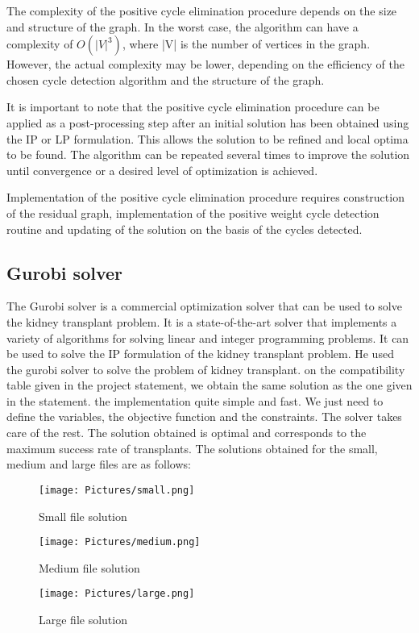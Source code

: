 \documentclass{ULBreport}
\begin{document}
The complexity of the positive cycle elimination procedure depends on the size and structure of the graph. In the worst case, the algorithm can have a complexity of  $O(|V|^3)$, where |V| is the number of vertices in the graph. However, the actual complexity may be lower, depending on the efficiency of the chosen cycle detection algorithm and the structure of the graph.

It is important to note that the positive cycle elimination procedure can be applied as a post-processing step after an initial solution has been obtained using the IP or LP formulation. This allows the solution to be refined and local optima to be found. The algorithm can be repeated several times to improve the solution until convergence or a desired level of optimization is achieved.

Implementation of the positive cycle elimination procedure requires construction of the residual graph, implementation of the positive weight cycle detection routine and updating of the solution on the basis of the cycles detected.

\subsection{Gurobi solver}

The Gurobi solver is a commercial optimization solver that can be used to solve the kidney transplant problem. It is a state-of-the-art solver that implements a variety of algorithms for solving linear and integer programming problems. It can be used to solve the IP formulation of the kidney transplant problem. He used the gurobi solver to solve the problem of kidney transplant. on the compatibility table given in the project statement, we obtain the same solution as the one given in the statement. the implementation quite simple and fast. We just need to define the variables, the objective function and the constraints. The solver takes care of the rest. The solution obtained is optimal and corresponds to the maximum success rate of transplants. 
The solutions obtained for the small, medium and large files are as follows:

\begin{figure}[h]
  \centering
  \begin{minipage}{0.32\textwidth}
    \centering
    \texttt{[image: Pictures/small.png]}
    \caption{Small file solution}
    \label{fig:small}
  \end{minipage}\hfill
  \begin{minipage}{0.32\textwidth}
    \centering
    \texttt{[image: Pictures/medium.png]}
    \caption{Medium file solution}
    \label{fig:medium}
  \end{minipage}\hfill
  \begin{minipage}{0.32\textwidth}
    \centering
    \texttt{[image: Pictures/large.png]}
    \caption{Large file solution}
    \label{fig:large}
  \end{minipage}
\end{figure}
\end{document}
